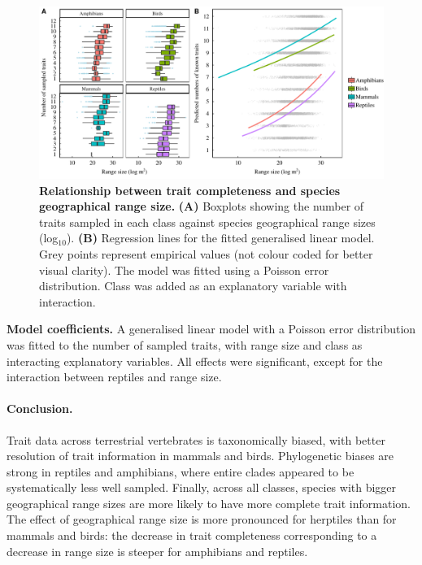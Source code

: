 \begin{figure}[h!]
\centering
\includegraphics[scale=0.7]{figures/chapter2/NA_spatial_patterns/Poisson_model_predictions}
\caption[Relationship between trait completeness and species geographical range size]{\textbf{Relationship between trait completeness and species geographical range size.} \textbf{(A)} Boxplots showing the number of traits sampled in each class against species geographical range sizes (log$_{10}$). \textbf{(B)} Regression lines for the fitted generalised linear model. Grey points represent empirical values (not colour coded for better visual clarity). The model was fitted using a Poisson error distribution. Class was added as an explanatory variable with interaction.}
\label{poisson}
\end{figure}

\begin{table}[h!]
\renewcommand{\baselinestretch}{1}
\renewcommand{\arraystretch}{1.2}
\begin{center}\fontsize{9}{11}\selectfont
\caption[Model coefficients]{\textbf{Model coefficients.} A generalised linear model with a Poisson error distribution was fitted to the number of sampled traits, with range size and class as interacting explanatory variables. All effects were significant, except for the interaction between reptiles and range size.}
\end{center}
\label{Poisson_model_coef}
\end{table}

\paragraph{Conclusion.} Trait data across terrestrial vertebrates is taxonomically biased, with better resolution of trait information in mammals and birds. Phylogenetic biases are strong in reptiles and amphibians, where entire clades appeared to be systematically less well sampled. Finally, across all classes, species with bigger geographical range sizes are more likely to have more complete trait information. The effect of geographical range size is more pronounced for herptiles than for mammals and birds: the decrease in trait completeness corresponding to a decrease in range size is steeper for amphibians and reptiles.


